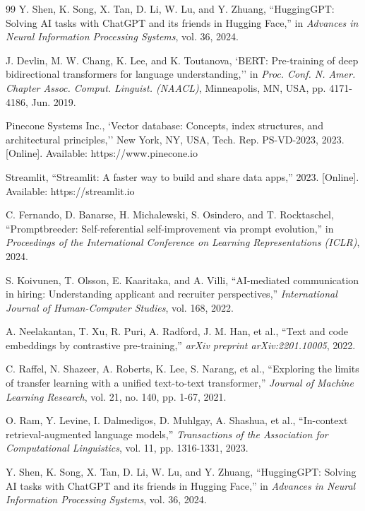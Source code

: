 \documentclass[12pt,a4paper]{report}
\begin{document}
\begin{thebibliography}{99}
Y. Shen, K. Song, X. Tan, D. Li, W. Lu, and Y. Zhuang, ``HuggingGPT: Solving AI tasks with ChatGPT and its friends in Hugging Face,'' in \textit{Advances in Neural Information Processing Systems}, vol. 36, 2024.

J. Devlin, M. W. Chang, K. Lee, and K. Toutanova, `BERT: Pre-training of deep bidirectional transformers for language understanding,'' in \textit{Proc. Conf. N. Amer. Chapter Assoc. Comput. Linguist. (NAACL)}, Minneapolis, MN, USA, pp. 4171-4186, Jun. 2019.

Pinecone Systems Inc., `Vector database: Concepts, index structures, and architectural principles,'' New York, NY, USA, Tech. Rep. PS-VD-2023, 2023. [Online]. Available: https://www.pinecone.io

Streamlit, ``Streamlit: A faster way to build and share data apps,'' 2023. [Online]. Available: https://streamlit.io

C. Fernando, D. Banarse, H. Michalewski, S. Osindero, and T. Rocktaschel, ``Promptbreeder: Self-referential self-improvement via prompt evolution,'' in \textit{Proceedings of the International Conference on Learning Representations (ICLR)}, 2024.

S. Koivunen, T. Olsson, E. Kaaritaka, and A. Villi, ``AI-mediated communication in hiring: Understanding applicant and recruiter perspectives,'' \textit{International Journal of Human-Computer Studies}, vol. 168, 2022.

A. Neelakantan, T. Xu, R. Puri, A. Radford, J. M. Han, et al., ``Text and code embeddings by contrastive pre-training,'' \textit{arXiv preprint arXiv:2201.10005}, 2022.

C. Raffel, N. Shazeer, A. Roberts, K. Lee, S. Narang, et al., ``Exploring the limits of transfer learning with a unified text-to-text transformer,'' \textit{Journal of Machine Learning Research}, vol. 21, no. 140, pp. 1-67, 2021.

O. Ram, Y. Levine, I. Dalmedigos, D. Muhlgay, A. Shashua, et al., ``In-context retrieval-augmented language models,'' \textit{Transactions of the Association for Computational Linguistics}, vol. 11, pp. 1316-1331, 2023.

Y. Shen, K. Song, X. Tan, D. Li, W. Lu, and Y. Zhuang, ``HuggingGPT: Solving AI tasks with ChatGPT and its friends in Hugging Face,'' in \textit{Advances in Neural Information Processing Systems}, vol. 36, 2024.


\end{thebibliography}
\end{document}
